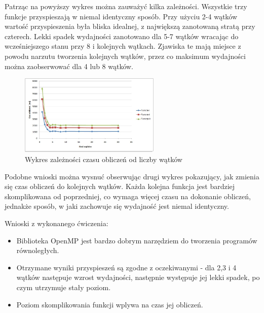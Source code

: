 \documentclass[a4paper,12pt]{article}
\newenvironment{lista}{
\begin{itemize}
  \setlength{\itemsep}{1pt}
  \setlength{\parskip}{0pt}
  \setlength{\parsep}{0pt}
}{\end{itemize}}
\begin{document}
Patrząc na powyższy wykres można zauważyć kilka zależności. Wszystkie trzy funkcje przyspieszają w niemal identyczny sposób. Przy użyciu 2-4 wątków wartość przyspieszenia była bliska idealnej, z największą zanotowaną stratą przy czterech. Lekki spadek wydajności zanotowano dla 5-7 wątków wracając do wcześniejszego stanu przy 8 i kolejnych wątkach. Zjawiska te mają miejsce z powodu narzutu tworzenia kolejnych wątków, przez co maksimum wydajności można zaobserwować dla 4 lub 8 wątków. 

\begin{figure}[!h]
	\centering
  \includegraphics[width=0.6\textwidth]{wykres2.jpg}
  \caption{Wykres zależności czasu obliczeń od liczby wątków}
\end{figure}

Podobne wnioski można wysnuć obserwując drugi wykres pokazujący, jak zmienia się czas obliczeń do kolejnych wątków. Każda kolejna funkcja jest bardziej skomplikowana od poprzedniej, co wymaga więcej czasu na dokonanie obliczeń, jednakże sposób, w jaki zachowuje się wydajność jest niemal identyczny.

\vspace{1cm}
Wnioski z wykonanego ćwiczenia:
\begin{lista}
 \item Biblioteka OpenMP jest bardzo dobrym narzędziem do tworzenia programów równoległych.
 \item Otrzymane wyniki przyspieszeń są zgodne z oczekiwanymi - dla 2,3 i 4 wątków następuje wzrost wydajności, następnie występuje jej lekki spadek, po czym utrzymuje stały poziom.
 \item Poziom skomplikowania funkcji wplywa na czas jej obliczeń.
\end{lista}
\end{document}
